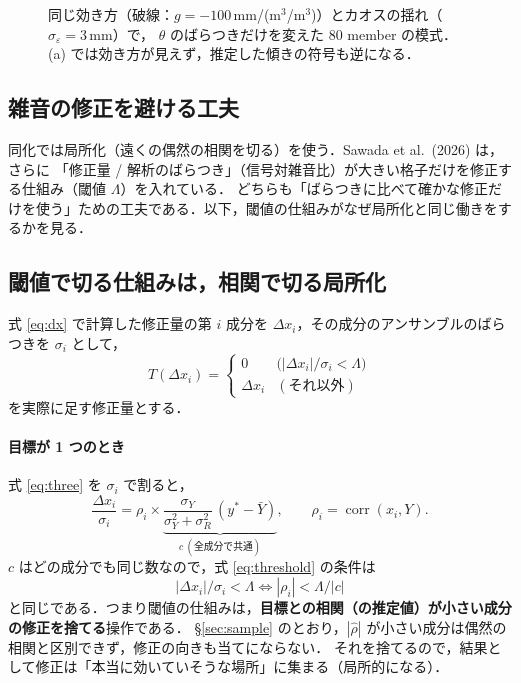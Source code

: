\documentclass[dvipdfmx,a4paper,10.5pt]{jarticle}
\numberwithin{equation}{section}
\newcommand{\corr}{\operatorname{corr}}
\begin{document}
\begin{figure}[H]
\caption{同じ効き方（破線：$g=-100$\,mm/(m$^3$/m$^3$)）とカオスの揺れ（$\sigma_\varepsilon=3$\,mm）で，
$\theta$ のばらつきだけを変えた 80 member の模式．(a) では効き方が見えず，推定した傾きの符号も逆になる．}
\label{fig:scatter}
\end{figure}

\subsection{雑音の修正を避ける工夫}
同化では局所化（遠くの偶然の相関を切る）を使う．Sawada et al.\ (2026) は，さらに
「修正量 / 解析のばらつき」（信号対雑音比）が大きい格子だけを修正する仕組み（閾値 $\Lambda$）を入れている．
どちらも「ばらつきに比べて確かな修正だけを使う」ための工夫である．以下，閾値の仕組みがなぜ局所化と同じ働きをするかを見る．

\subsection{閾値で切る仕組みは，相関で切る局所化}\label{sec:threshold}
式 \eqref{eq:dx} で計算した修正量の第 $i$ 成分を $\Delta x_i$，その成分のアンサンブルのばらつきを $\sigma_i$ として，
\begin{equation}
  T(\Delta x_i)=
  \begin{cases}
    0 & \bigl(|\Delta x_i|/\sigma_i<\Lambda\bigr)\\[2pt]
    \Delta x_i & (\text{それ以外})
  \end{cases}
  \label{eq:threshold}
\end{equation}
を実際に足す修正量とする．

\paragraph{目標が 1 つのとき}
式 \eqref{eq:three} を $\sigma_i$ で割ると，
\begin{equation}
  \frac{\Delta x_i}{\sigma_i}
  = \rho_i\times\underbrace{\frac{\sigma_Y}{\sigma_Y^2+\sigma_R^2}\,(y^*-\bar Y)}_{c\ (\text{全成分で共通})},
  \qquad \rho_i=\corr(x_i,Y).
  \label{eq:snr}
\end{equation}
$c$ はどの成分でも同じ数なので，式 \eqref{eq:threshold} の条件は
\begin{equation}
  \boxed{\;|\Delta x_i|/\sigma_i<\Lambda \iff |\rho_i|<\Lambda/|c|\;}
  \label{eq:rhocut}
\end{equation}
と同じである．つまり閾値の仕組みは，\textbf{目標との相関（の推定値）が小さい成分の修正を捨てる}操作である．
\S\ref{sec:sample} のとおり，$|\hat\rho|$ が小さい成分は偶然の相関と区別できず，修正の向きも当てにならない．
それを捨てるので，結果として修正は「本当に効いていそうな場所」に集まる（局所的になる）．
\end{document}
